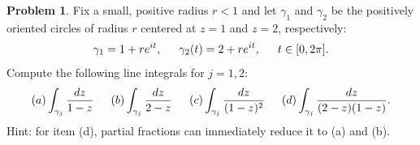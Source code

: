 \documentclass[12pt]{article}
\theoremstyle{definition}
\newtheorem{ex}{Problem}
\begin{document}
\begin{ex}
	Fix a small, positive radius $r < 1$ and let $\gamma_1$ and $\gamma_2$ be the positively oriented circles of radius $r$ centered at $z = 1$ and $z = 2$, respectively: \begin{equation*}
		\gamma_1 = 1 + re^{it}, \hspace{1.5em} \gamma_2(t) = 2+re^{it},\hspace{1.5em} t \in [0, 2\pi].
	\end{equation*}
	Compute the following line integrals for $j = 1,2$: \begin{equation*}
		(a) \int_{\gamma_j} \frac{dz}{1-z} \hspace{1.5em} (b) \int_{\gamma_j}\frac{dz}{2-z} \hspace{1.5em} (c) \int_{\gamma_j} \frac{dz}{(1-z)^2} \hspace{1.5em} (d) \int_{\gamma_j} \frac{dz}{(2-z)(1-z)}.
	\end{equation*}
	Hint: for item (d), partial fractions can immediately reduce it to (a) and (b).
\end{ex}
\end{document}
